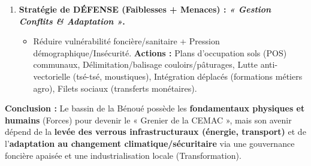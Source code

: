 \documentclass[11pt]{article}
\begin{document}
\begin{exoresolu}
\begin{enumerate}
\begin{itemize}
    \end{itemize}
    \item \textbf{Stratégie de DÉFENSE (Faiblesses + Menaces) : \emph{« Gestion Conflits \& Adaptation »}.}
    \begin{itemize}
        \item Réduire vulnérabilité foncière/sanitaire + Pression démographique/Insécurité.
        \textbf{Actions :} Plans d'occupation sols (POS) communaux, Délimitation/balisage couloirs/pâturages, Lutte anti-vectorielle (tsé-tsé, moustiques), Intégration déplacés (formations métiers agro), Filets sociaux (transferts monétaires).
    \end{itemize}
\end{enumerate}

\textbf{Conclusion :} Le bassin de la Bénoué possède les \textbf{fondamentaux physiques et humains} (Forces) pour devenir le « Grenier de la CEMAC », mais son avenir dépend de la \textbf{levée des verrous infrastructuraux (énergie, transport)} et de l'\textbf{adaptation au changement climatique/sécuritaire} via une gouvernance foncière apaisée et une industrialisation locale (Transformation).
\end{exoresolu}
\end{document}
